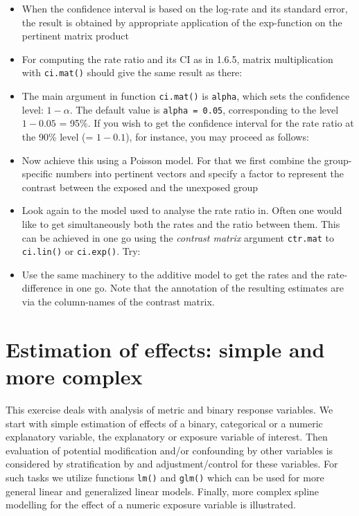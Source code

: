 \documentclass[
]{book}
\begin{document}
\begin{itemize}
\item
  When the confidence interval is based on the log-rate and its
  standard error, the result is obtained by appropriate application of
  the exp-function on the pertinent matrix product
\item
  For computing the rate ratio and its CI as in 1.6.5, matrix
  multiplication with \texttt{ci.mat()} should give the same result as
  there:
\item
  The main argument in function \texttt{ci.mat()} is \texttt{alpha},
  which sets the confidence level: \(1 - \alpha\). The default value is
  \texttt{alpha\ =\ 0.05}, corresponding to the level \(1 - 0.05\) = 95\%.
  If you wish to get the confidence interval for the rate ratio at
  the 90\% level (= \(1-0.1\)), for instance, you may proceed as
  follows:
\item
  Now achieve this using a Poisson model. For that we first combine
  the group-specific numbers into pertinent vectors and specify a factor to represent the contrast between the exposed and the unexposed group
\item
  Look again to the model used to analyse the rate ratio in. Often one would like to get simultaneously both
  the rates and the ratio between them. This can be achieved in one go
  using the \emph{contrast matrix} argument \texttt{ctr.mat} to
  \texttt{ci.lin()} or \texttt{ci.exp()}. Try:
\item
  Use the same machinery to the additive model to get the rates
  and the rate-difference in one go. Note that the annotation of the
  resulting estimates are via the column-names of the contrast matrix.
\end{itemize}

\chapter{Estimation of effects: simple and more complex}\label{estimation-of-effects-simple-and-more-complex}

This exercise deals with analysis of metric and binary
response variables.
We start with simple estimation of effects of a binary, categorical or
a numeric explanatory variable, the explanatory or exposure variable of interest.
Then evaluation of potential modification and/or confounding by other variables
is considered by stratification by and adjustment/control for these variables.
For such tasks we utilize functions \texttt{lm()} and \texttt{glm()}
which can be used for more
general linear and generalized linear models. Finally, more complex
spline modelling for the effect of a numeric exposure variable is
illustrated.
\end{document}

